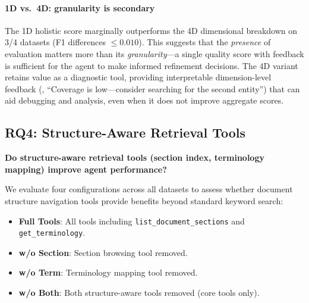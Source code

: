 \paragraph{1D vs.\ 4D: granularity is secondary}
The 1D holistic score marginally outperforms the 4D dimensional breakdown on 3/4 datasets (F1 differences $\leq 0.010$).
This suggests that the \emph{presence} of evaluation matters more than its \emph{granularity}---a single quality score with feedback is sufficient for the agent to make informed refinement decisions.
The 4D variant retains value as a diagnostic tool, providing interpretable dimension-level feedback (\eg, ``Coverage is low---consider searching for the second entity'') that can aid debugging and analysis, even when it does not improve aggregate scores.

\subsection{RQ4: Structure-Aware Retrieval Tools}
\label{subsec:rq4}

\textbf{Do structure-aware retrieval tools (section index, terminology mapping) improve agent performance?}

We evaluate four configurations across all datasets to assess whether document structure navigation tools provide benefits beyond standard keyword search:
\begin{itemize}
    \item \textbf{Full Tools}: All tools including \texttt{list\_document\_sections} and \texttt{get\_terminology}.
    \item \textbf{w/o Section}: Section browsing tool removed.
    \item \textbf{w/o Term}: Terminology mapping tool removed.
    \item \textbf{w/o Both}: Both structure-aware tools removed (core tools only).
\end{itemize}

